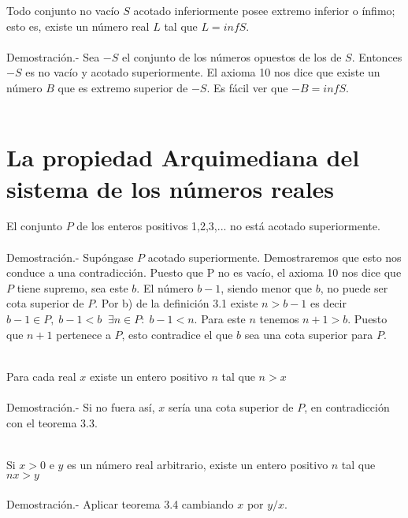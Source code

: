 \begin{teo}
Todo conjunto no vacío $S$ acotado inferiormente posee extremo inferior  o ínfimo; esto es, existe un número real $L$ tal que $L=infS$.\\\\
Demostración.- \; Sea $-S$ el conjunto de los números opuestos de los de $S$. Entonces $-S$ es no vacío y acotado superiormente. El axioma 10 nos dice que existe un número $B$ que es extremo superior de $-S$. Es fácil ver que $-B=infS$.\\\\
\end{teo}

\section{La propiedad Arquimediana del sistema de los números reales}
\begin{teo}
El conjunto $P$ de los enteros positivos 1,2,3,... no está acotado superiormente.\\\\
Demostración.- \; Supóngase $P$ acotado superiormente. Demostraremos que esto nos conduce a una contradicción. Puesto que P no es vacío, el axioma 10 nos dice que $P$ tiene supremo, sea este $b$. El número $b-1$, siendo menor que $b$, no puede ser cota superior de $P$. Por b) de la definición 3.1 existe $n>b-1$ es decir $b-1 \in P, \; b-1<b \; \; \exists n \in P:\; b-1<n$. Para este $n$ tenemos $n+1>b$. Puesto que $n+1$ pertenece a $P$, esto contradice el que $b$ sea una cota superior para $P$. \\\\
\end{teo}

\begin{teo}
Para cada real $x$ existe un entero positivo $n$ tal que $n>x$\\\\
Demostración.- \; Si no fuera así, $x$ sería una cota superior de $P$, en contradicción con el teorema 3.3.\\\\
\end{teo}

\begin{teo}
Si $x>0$ e $y$ es un número real arbitrario, existe un entero positivo $n$ tal que $nx>y$\\\\
Demostración.- \; Aplicar teorema 3.4 cambiando $x$ por $y/x$.\\\\
\end{teo}

